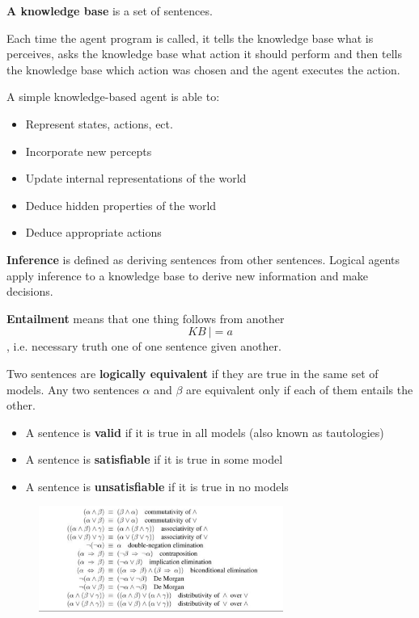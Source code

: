 \documentclass{article}
\begin{document}
\textbf{A knowledge base} is a set of sentences.

Each time the agent program is called, it tells the knowledge base what is perceives, asks the knowledge base what action it should perform and then tells the knowledge base which action was chosen and the agent executes the action. 

A simple knowledge-based agent is able to:
\begin{itemize}
    \item Represent states, actions, ect.
    \item Incorporate new percepts
    \item Update internal representations of the world 
    \item Deduce hidden properties of the world 
    \item Deduce appropriate actions
\end{itemize}

\textbf{Inference} is defined as deriving sentences from other sentences. Logical agents apply inference to a knowledge base to derive new information and make decisions. 

\textbf{Entailment} means that one thing follows from another $$KB \: |= a$$, i.e. necessary truth one of one sentence given another. 

Two sentences are \textbf{logically equivalent} if they are true in the same set of models. Any two sentences $\alpha$ and $\beta$ are equivalent only if each of them entails the other. 

\begin{itemize}
    \item A sentence is \textbf{valid} if it is true in all models (also known as tautologies)
    \item A sentence is \textbf{satisfiable} if it is true in some model
    \item A sentence is \textbf{unsatisfiable} if it is true in no models 
\end{itemize}

\begin{figure}[ht]
\includegraphics[width=8cm]{Standard Logical Equivalences.png}
\centering
\end{figure}
\end{document}
